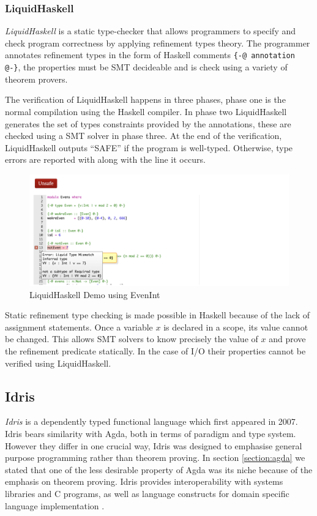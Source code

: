 \documentclass[a4paper,12pt]{report}
\begin{document}
\subsubsection{LiquidHaskell}
\textit{LiquidHaskell} \cite{liquidHaskell} 
is a static type-checker that allows programmers to specify and 
check program correctness by applying refinement types theory. The programmer 
annotates refinement types in the form of Haskell comments 
\verb|{-@ annotation @-}|, the properties must be SMT decideable and is check 
using a variety of theorem provers. 

\par
The verification of LiquidHaskell happens in three phases, phase one is the 
normal compilation using the Haskell compiler. In phase two LiquidHaskell 
generates the set of types constraints provided by the annotations, these are 
checked using a SMT solver in phase three. At the end of the verification, 
LiquidHaskell outputs ``SAFE'' if the program is well-typed. Otherwise, 
type errors are reported with along with the line it occurs. 

\begin{figure}[H] 
  \begin{center}
    \includegraphics[scale=0.5]{assets/lh_demo_sm.PNG}
  \end{center}
  \caption{LiquidHaskell Demo using EvenInt}
  \label{fig:lh_demo}
\end{figure}

\par
Static refinement type checking is made possible in Haskell because of the lack 
of assignment statements. Once a variable $x$ is declared in a scope, its value 
cannot be changed. This allows SMT solvers to know precisely the value of $x$ 
and prove the refinement predicate statically. In the case of I/O 
their properties cannot be verified using LiquidHaskell.

\subsection{Idris}
\textit{Idris} \cite{idris} is a dependently typed functional language which first 
appeared in 2007. Idris bears similarity with Agda, both in terms of paradigm 
and type system. However they differ in one crucial way, Idris was designed to 
emphasise general purpose programming rather than theorem proving. In section 
\ref{section:agda} we stated that one of the less desirable property of 
Agda was its niche because of the emphasis on theorem proving. Idris provides 
interoperability with systems libraries and C programs, 
as well as language constructs for domain specific language 
implementation \cite{gpIdris}. 
\end{document}

